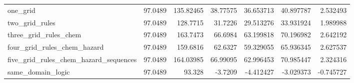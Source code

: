 \begin{tabular}{lrrrrrr}
  one_grid & 97.0489 & 135.82465 & 38.77575 & 36.653713 & 40.897787 & 2.532493 \\
  two_grid_rules & 97.0489 & 128.7715 & 31.7226 & 29.513276 & 33.931924 & 1.989988 \\
  three_grid_rules_chem & 97.0489 & 163.7473 & 66.6984 & 63.199818 & 70.196982 & 2.642192 \\
  four_grid_rules_chem_hazard & 97.0489 & 159.6816 & 62.6327 & 59.329055 & 65.936345 & 2.627537 \\
  five_grid_rules_chem_hazard_sequences & 97.0489 & 164.03985 & 66.99095 & 62.996453 & 70.985447 & 2.324316 \\
  same_domain_logic & 97.0489 & 93.328 & -3.7209 & -4.412427 & -3.029373 & -0.745727 \\
\bottomrule
\end{tabular}
